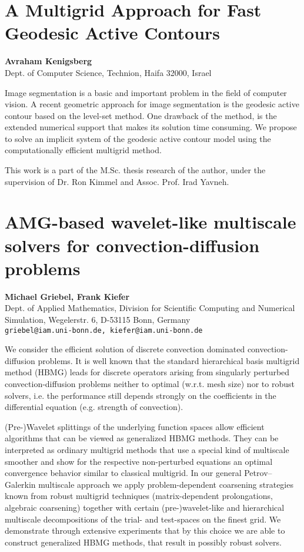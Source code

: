 \documentclass[11pt]{article}
\newcommand{\nextab}[4]{
	\section{#2}
	{\bf #1} \\ \nopagebreak
	{#3} \\ \nopagebreak
	{\tt #4} \nopagebreak
	}
\begin{document}

\nextab
{Avraham Kenigsberg}
{A Multigrid Approach for Fast Geodesic Active Contours}
{Dept. of Computer Science, Technion, Haifa 32000, Israel}
{}

Image segmentation is a basic and important problem in the field
of computer vision. A recent geometric approach for image
segmentation is the geodesic active contour based on the level-set
method. One drawback of the method, is the extended numerical
support that makes its solution time consuming. We propose to solve an
implicit system of the geodesic active contour model using the
computationally efficient multigrid method.

This work is a part of the M.Sc. thesis research of the author,
under the supervision of Dr. Ron Kimmel and Assoc. Prof. Irad Yavneh.





\nextab
{Michael Griebel, Frank Kiefer}
{AMG-based wavelet-like multiscale solvers for convection-diffusion problems}
{Dept. of Applied Mathematics, Division for Scientific Computing and Numerical Simulation, Wegelerstr. 6, D-53115 Bonn, Germany}
{griebel@iam.uni-bonn.de, kiefer@iam.uni-bonn.de}


We consider the efficient solution of discrete convection
dominated convection-diffusion problems.  It is well known that
the standard hierarchical basis multigrid method (HBMG) leads
for discrete operators arising from singularly perturbed
convection-diffusion problems neither to optimal (w.r.t.
mesh size) nor to robust solvers, i.e. the performance still
depends strongly on the coefficients in the differential
equation (e.g. strength of convection).

(Pre-)Wavelet splittings of the underlying function spaces allow
efficient algorithms that can be viewed as generalized HBMG
methods.  They can be interpreted as ordinary multigrid methods
that use a special kind of multiscale smoother and show for the
respective non-perturbed equations an optimal convergence
behavior similar to classical multigrid.  In our general
Petrov--Galerkin multiscale approach we apply problem-dependent
coarsening strategies known from robust multigrid techniques
(matrix-dependent prolongations, algebraic coarsening) together
with certain (pre-)wavelet-like and hierarchical multiscale
decompositions of the trial- and test-spaces on the finest
grid.  We demonstrate through extensive experiments that by this
choice we are able to construct generalized HBMG methods, that
result in possibly robust solvers.
\end{document}
